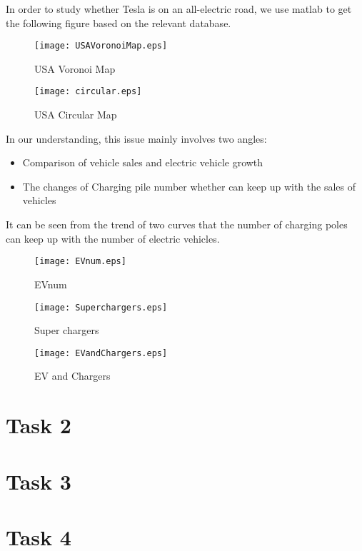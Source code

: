 \documentclass{mcmthesis}
\begin{document}
In order to study whether Tesla is on an all-electric road, we use matlab to get the following figure based on the relevant database.

\begin{figure}[H]
\small
\centering
\texttt{[image: USAVoronoiMap.eps]}
\caption{USA Voronoi Map} 
\end{figure}

\begin{figure}[htbp]
\small
\centering
\texttt{[image: circular.eps]}
\caption{USA Circular Map} 
\end{figure}


In our understanding, this issue mainly involves two angles:

\begin{itemize}
\item Comparison of vehicle sales and electric vehicle growth
\item The changes of Charging pile number whether can keep up with the sales of vehicles
\end{itemize}


It can be seen from the trend of two curves that the number of charging poles can keep up with the number of electric vehicles.


\begin{figure}[htbp]
\small
\centering
\texttt{[image: EVnum.eps]}
\caption{EVnum} 
\end{figure}

\begin{figure}[htbp]
\small
\centering
\texttt{[image: Superchargers.eps]}
\caption{Super chargers} 
\end{figure}


\begin{figure}[H]
\small
\centering
\texttt{[image: EVandChargers.eps]}
\caption{EV and Chargers} 
\end{figure}

\section{Task 2}

\section{Task 3}



\section{Task 4}
\end{document}
